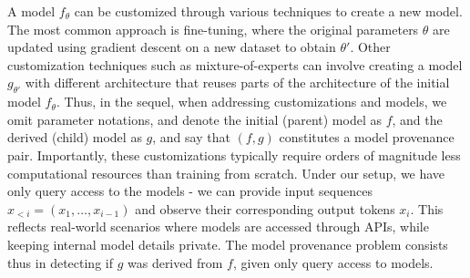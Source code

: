 A model $f_\theta$ can be customized through various techniques to create a new model. The most common approach is fine-tuning, where the original parameters $\theta$ are updated using gradient descent on a new dataset to obtain $\theta'$. Other customization techniques such as mixture-of-experts can involve creating a model $g_{\theta'}$ with different architecture that reuses parts of the architecture of the initial model $f_\theta$. Thus, in the sequel, when addressing customizations and models, we omit parameter notations, and denote the initial (parent) model as $f$, and the derived (child) model as $g$, and say that $(f,g)$ constitutes a model provenance pair. Importantly, these customizations typically require orders of magnitude less computational resources than training from scratch.
%
Under our setup, we have only query access to the models - we can provide input sequences $x_{<i}=(x_1,\ldots,x_{i-1})$ and observe their corresponding output tokens $x_i$. This reflects real-world scenarios where models are accessed through APIs, while keeping internal model details private. 
The model provenance problem consists thus in detecting if $g$ was derived from $f$, given only query access to models. 
\begin{comment}
We are now ready to state the main problem.
\begin{definition}[Model Provenance Problem]
Given only query access to models,  decide if a pair of models $(f,g)$ constitutes a model provenance pair. 
\end{definition}
\ivica{removed "f,g" from "query access to models $f,g$", because we need to query control models as well, not only f and g.}

\prateek{The definition is circular. It may be better to phrase the technical statement as that of testing similarity of the two distributions directly now. Define your notion of similarity first, and then say why you think its reasonable thereafter.}
\ivica{model provenance has nothing to do with similarity, we used similarity to detect, but definition cannot contain similarity.}

\teo{At first I didn't see a problem but I think the issue is that we have "Definition" as if we are formally defining something but it is not really doing that because we don't say what something of the type property P(f,g). If P(f,g) is True, model provenance tester returns True. }

\ivica{Ok, lets remove the formal definitions from the paper, we will only use informal.}
\end{comment}

